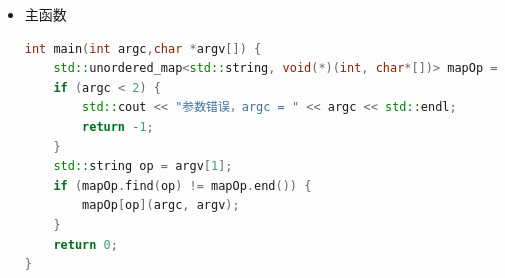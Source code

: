 \documentclass[UTF8,a4paper,10pt]{ctexart}
\begin{document}
\begin{itemize}
\begin{lstlisting}[language = C++]
    std::ifstream fileStream(filePath);
    MD5 md5;
    md5.Update(fileStream);
    std::string genMD5 = md5.Tostring();
    std::cout << "The new MD5 value of file(\"" << filePath << "\") that has computed is" << std::endl << genMD5 << std::endl;
    if (!genMD5.compare(oldMD5Str)) {
        std::cout << "OK! The file is integrated" << std::endl;
    }
    else {
        std::cout << "Match Error! The file has been modified!" << std::endl;
    }
}
    \end{lstlisting}
    \item 主函数
    \begin{lstlisting}[language = C++]
int main(int argc,char *argv[]) { 
    std::unordered_map<std::string, void(*)(int, char*[])> mapOp = {{"-t", print_t}, {"-h", print_h}, {"-c", print_c}, {"-v", print_v}, {"-f", print_f}};
    if (argc < 2) { 
        std::cout << "参数错误，argc = " << argc << std::endl;
        return -1;
    }
    std::string op = argv[1];
    if (mapOp.find(op) != mapOp.end()) {
        mapOp[op](argc, argv);
    }
    return 0;
}
    \end{lstlisting}
\end{itemize}
\end{document}
